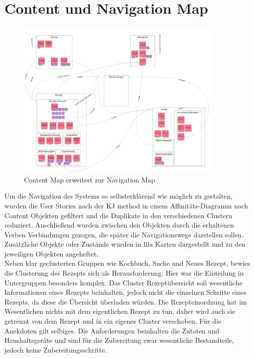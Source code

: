 \section{Content und Navigation Map}
\begin{figure}[h] %
    \centering
    \includegraphics[width=0.9\textwidth]{images/navigationmap.jpg}
    \caption[Content Map erweitert zur Navigation Map]{Content Map erweitert zur Navigation Map}
    \label{fig:navigationmap}
\end{figure}
Um die Navigation des Systems so selbsterklärend wie möglich zu gestalten, wurden die User Stories nach der KJ method \cite[Kavakita Jiro]{KJmethod_1997} in einem Affinitäts-Diagramm nach Content Objekten gefiltert und die Duplikate in den verschiedenen Clustern reduziert. Anschließend wurden zwischen den Objekten durch die erhaltenen Verben Verbindungen gezogen, die später die Navigationswege darstellen sollen. Zusätzliche Objekte oder Zustände wurden in lila Karten dargestellt und zu den jeweiligen Objekten angeheftet.\\

Neben klar geclusterten Gruppen wie Kochbuch, Suche und Neues Rezept, bewies die Clusterung des Rezepts sich als Herausforderung. Hier war die Einteilung in Untergruppen besonders komplex. Das Cluster Rezeptübersicht soll wesentliche Informationen eines Rezepts beinhalten, jedoch nicht die einzelnen Schritte eines Rezepts, da diese die Übersicht überladen würden. Die Rezepteinordnung hat im Wesentlichen nichts mit dem eigentlichen Rezept zu tun, daher wird auch sie getrennt von dem Rezept und in ein eigenes Cluster verschoben. Für die Anekdoten gilt selbiges. Die Anforderungen beinhalten die Zutaten und Haushaltsgeräte und sind für die Zubereitung zwar wesentliche Bestandteile, jedoch keine Zubereitungsschritte.\\ 


